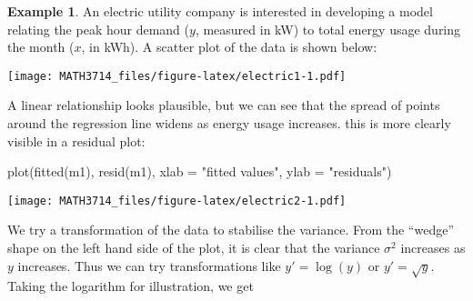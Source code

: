\documentclass[
  a4paper,
]{article}
\newenvironment{Shaded}{\begin{snugshade}}{\end{snugshade}}
\newcommand{\AttributeTok}[1]{\textcolor[rgb]{0.77,0.63,0.00}{#1}}
\newcommand{\CommentTok}[1]{\textcolor[rgb]{0.56,0.35,0.01}{\textit{#1}}}
\newcommand{\ConstantTok}[1]{\textcolor[rgb]{0.00,0.00,0.00}{#1}}
\newcommand{\FunctionTok}[1]{\textcolor[rgb]{0.00,0.00,0.00}{#1}}
\newcommand{\NormalTok}[1]{#1}
\newcommand{\OtherTok}[1]{\textcolor[rgb]{0.56,0.35,0.01}{#1}}
\newcommand{\SpecialCharTok}[1]{\textcolor[rgb]{0.00,0.00,0.00}{#1}}
\newcommand{\StringTok}[1]{\textcolor[rgb]{0.31,0.60,0.02}{#1}}
\theoremstyle{definition}
\theoremstyle{definition}
\newtheorem{example}{Example}[section]
\theoremstyle{definition}
\theoremstyle{definition}
\theoremstyle{remark}
\begin{document}
\begin{example}
\protect\hypertarget{exm:electric}{}\label{exm:electric}An electric utility company is interested in developing a model relating the
peak hour demand (\(y\), measured in kW) to total energy usage during the month
(\(x\), in kWh). A scatter plot of the data is shown below:

\begin{Shaded}
\end{Shaded}

\texttt{[image: MATH3714\_files/figure-latex/electric1-1.pdf]}

A linear relationship looks plausible, but we can see that the spread
of points around the regression line widens as energy usage increases.
this is more clearly visible in a residual plot:

\begin{Shaded}
\begin{Highlighting}[]
\FunctionTok{plot}\NormalTok{(}\FunctionTok{fitted}\NormalTok{(m1), }\FunctionTok{resid}\NormalTok{(m1),}
     \AttributeTok{xlab =} \StringTok{"fitted values"}\NormalTok{, }\AttributeTok{ylab =} \StringTok{"residuals"}\NormalTok{)}
\end{Highlighting}
\end{Shaded}

\texttt{[image: MATH3714\_files/figure-latex/electric2-1.pdf]}

We try a transformation of the data to stabilise the variance.
From the ``wedge'' shape on the left hand side of the plot, it is clear
that the variance \(\sigma^2\) increases as \(y\) increases.
Thus we can try transformations like \(y' = \log(y)\) or
\(y' = \sqrt{y}\). Taking the logarithm for illustration, we get


\end{example}
\end{document}
